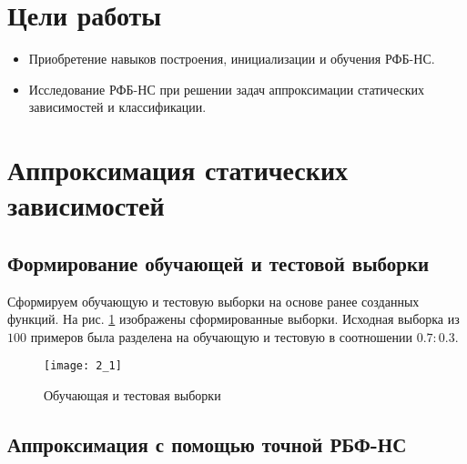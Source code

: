 





\tableofcontents
\newpage

\section{Цели работы}

\begin{itemize}
	\item Приобретение навыков построения, инициализации и обучения РФБ-НС.
	\item Исследование РФБ-НС при решении задач аппроксимации статических зависимостей и классификации.
\end{itemize}

\section{Аппроксимация статических зависимостей}

\subsection{Формирование обучающей и тестовой выборки}


Сформируем обучающую и тестовую выборки на основе ранее созданных функций. На рис. \ref{fig:2_1} изображены сформированные выборки. Исходная выборка из $100$ примеров была разделена на обучающую и тестовую в соотношении $0.7 : 0.3$.

\begin{figure}[H]
\begin{center}
	\texttt{[image: 2\_1]}
	\caption{Обучающая и тестовая выборки}
	\label{fig:2_1}
\end{center}
\end{figure}

\subsection{Аппроксимация с помощью точной РБФ-НС}


